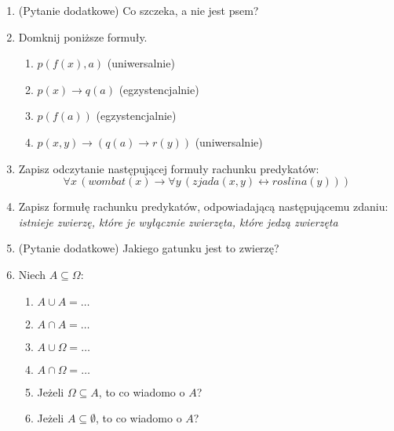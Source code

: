 \documentclass{mwart}
\renewcommand{\iff}{\ensuremath\leftrightarrow}
\renewcommand{\iff}{\leftrightarrow}
\begin{document}
\begin{enumerate}
\begin{multicols}{2}
\begin{enumerate}
	\end{enumerate}
	\end{multicols}
\item (Pytanie dodatkowe) Co szczeka, a nie jest psem?	
		\item Domknij poniższe formuły.
		\begin{multicols}{2}
			\begin{enumerate}
				\item $p(f(x), a)$ (uniwersalnie)
				\item $p(x) \to q(a)$ (egzystencjalnie)
				\item $p(f(a))$ (egzystencjalnie)
				\item $p(x,y)\to (q(a)\to r(y))$ (uniwersalnie)
			\end{enumerate}
		\end{multicols}
\item Zapisz odczytanie następującej formuły rachunku predykatów:
	\[ \forall x\, (wombat(x) \to \forall y\,(zjada(x,y)\iff roslina(y))) \] 
\item Zapisz formułę rachunku predykatów, odpowiadającą następującemu zdaniu: \emph{istnieje zwierzę, które je wyłącznie zwierzęta, które jedzą zwierzęta}
\item (Pytanie dodatkowe) Jakiego gatunku jest to zwierzę?
\item Niech $A\subseteq \Omega$:
\begin{enumerate}
\item $A\cup A=\ldots$
\item $A\cap A=\ldots$
\item $A\cup \Omega=\ldots$
\item $A\cap \Omega=\ldots$
\item Jeżeli $\Omega\subseteq A$, to co wiadomo o $A$?
\item Jeżeli $A\subseteq \emptyset$, to co wiadomo o $A$?
\end{enumerate}
\end{enumerate}
\end{document}
